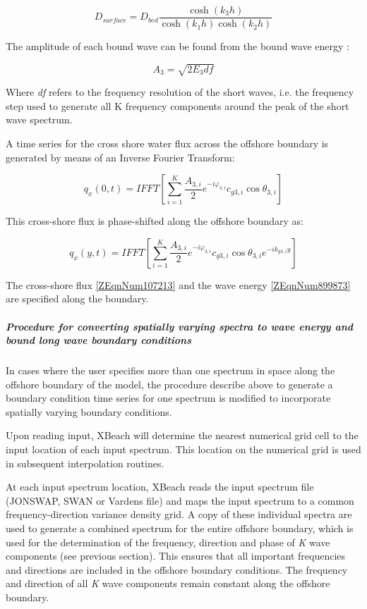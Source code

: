 \begin{equation} \label{2.29)} 
D_{surface} =D_{bed} \frac{\cosh \left(k_{3} h\right)}{\cosh \left(k_{1} h\right)\cosh \left(k_{2} h\right)}  
\end{equation} 

The amplitude of each bound wave can be found from the bound wave energy \citep{VanDongeren2003}:

\begin{equation} \label{2.30)} 
A_{3} =\sqrt{2E_{3} df}  
\end{equation} 

Where \textit{df} refers to the frequency resolution of the short waves, i.e. the frequency step used to generate all K frequency components around the peak of the short wave spectrum. 

A time series for the cross shore water flux across the offshore boundary is generated by means of an Inverse Fourier Transform:

\begin{equation} \label{2.31)} 
q_{x} (0,t)=IFFT\left[\sum _{i=1}^{K}\frac{A_{3,i} }{2}  e^{-i\varphi _{3,i} } c_{g3,i} \cos \theta _{3,i} \right] 
\end{equation} 

This cross-shore flux is phase-shifted along the offshore boundary as:

\begin{equation} \label{ZEqnNum107213} 
q_{x} (y,t)=IFFT\left[\sum _{i=1}^{K}\frac{A_{3,i} }{2}  e^{-i\varphi _{3,i} } c_{g3,i} \cos \theta _{3,i} e^{-ik_{y3,i} y} \right] 
\end{equation} 

The cross-shore flux \eqref{ZEqnNum107213} and the wave energy \eqref{ZEqnNum899873} are specified along the boundary.

\subparagraph{Procedure for converting spatially varying spectra to wave energy and bound long wave boundary conditions}

In cases where the user specifies more than one spectrum in space along the offshore boundary of the model, the procedure describe above to generate a boundary condition time series for one spectrum is modified to incorporate spatially varying boundary conditions.

Upon reading input, XBeach will determine the nearest numerical grid cell to the input location of each input spectrum. This location on the numerical grid is used in subsequent interpolation routines. 

At each input spectrum location, XBeach reads the input spectrum file (JONSWAP, SWAN or Vardens file) and maps the input spectrum to a common frequency-direction variance density grid. A copy of these individual spectra are used to generate a combined spectrum for the entire offshore boundary, which is used for the determination of the frequency, direction and phase of \textit{K} wave components (see previous section). This ensures that all important frequencies and directions are included in the offshore boundary conditions. The frequency and direction of all \textit{K} wave components remain constant along the offshore boundary.

